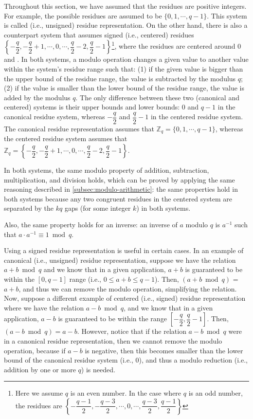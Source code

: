 Throughout this section, we have assumed that the residues are positive integers. For example, the possible residues  are assumed to be $\{0, 1, \cdots, q-1\}$. This system is called  (i.e., unsigned) residue representation. On the other hand, there is also a counterpart system that assumes signed (i.e., centered) residues $\left\{-\dfrac{q}{2}, -\dfrac{q}{2} + 1, \cdots, 0, \cdots, \dfrac{q}{2} - 2, \dfrac{q}{2} - 1\right\}$\footnote{Here we assume $q$ is an even number. In the case where $q$ is an odd number, the residues are $\left\{ -\dfrac{q-1}{2}, -\dfrac{q-3}{2}, \cdots, 0, \cdots, \dfrac{q-3}{2}, \dfrac{q-1}{2}\right\}$}, where the residues are centered around $0$ and . In both systems, a modulo operation changes a given value to another value within the system's residue range such that: (1) if the given value is bigger than the upper bound of the residue range, the value is subtracted by the modulus $q$; (2) if the value is smaller than the lower bound of the residue range, the value is added by the modulus $q$. The only difference between these two (canonical and centered) systems is their upper bounds and lower bounds: $0$ and $q-1$ in the canonical residue system, whereas $-\dfrac{q}{2}$ and $\dfrac{q}{2} - 1$ in the centered residue system. The canonical residue representation assumes that $\mathbb{Z}_q = \{0, 1, \cdots, q-1\}$, whereas the centered residue system assumes that $\mathbb{Z}_q = \left\{-\dfrac{q}{2}, -\dfrac{q}{2} + 1, \cdots, 0, \cdots, \dfrac{q}{2} - 2, \dfrac{q}{2} - 1\right\}$. 

In both systems, the same modulo property of addition, subtraction, multiplication, and division holds, which can be proved by applying the same reasoning described in \autoref{subsec:modulo-arithmetic}: the same properties hold in both systems because any two congruent residues in the centered system are separated by the $kq$ gaps (for some integer $k$) in both systems. 

Also, the same property holds for an inverse: an inverse of $a$ modulo $q$ is $a^{-1}$ such that $a \cdot a^{-1} \equiv 1 \bmod q$. 

Using a signed residue representation is useful in certain cases. In an example of canonical (i.e., unsigned) residue representation, suppose we have the relation $a + b \bmod q$ and we know that in a given application, $a + b$ is guaranteed to be within the $[0, q-1]$ range (i.e., $0 \leq a + b \leq q-1$). Then, $(a + b \bmod q)$ = $a + b$, and thus we can remove the modulo operation, simplifying the relation. Now, suppose a different example of centered (i.e., signed) residue representation where we have the relation $a - b \bmod q$, and we know that in a given application, $a - b$ is guaranteed to be within the range $\left[-\dfrac{q}{2}, \dfrac{q}{2} - 1\right]$. Then, $(a - b \bmod q) = a - b$. However, notice that if the relation $a - b \bmod q$ were in a canonical residue representation, then we cannot remove the modulo operation, because if $a - b$ is negative, then this becomes smaller than the lower bound of the canonical residue system (i.e., $0$), and thus a modulo reduction (i.e., addition by one or more $q$) is needed. 

